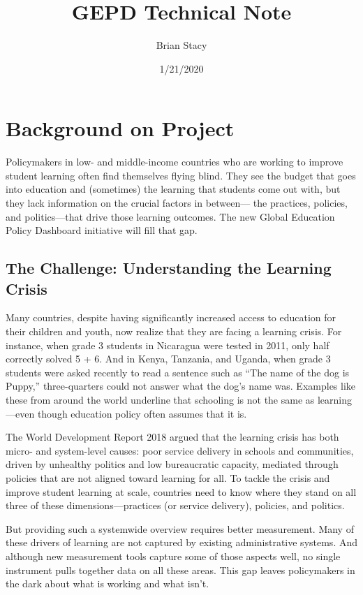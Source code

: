 \documentclass[]{article}
\title{GEPD Technical Note}
\author{Brian Stacy}
\date{1/21/2020}
\begin{document}
\maketitle

{
\setcounter{tocdepth}{2}
\tableofcontents
}
\hypertarget{background-on-project}{%
\section{Background on Project}\label{background-on-project}}

Policymakers in low- and middle-income countries who are working to
improve student learning often find themselves flying blind. They see
the budget that goes into education and (sometimes) the learning that
students come out with, but they lack information on the crucial factors
in between--- the practices, policies, and politics---that drive those
learning outcomes. The new Global Education Policy Dashboard initiative
will fill that gap.

\hypertarget{the-challenge-understanding-the-learning-crisis}{%
\subsection{The Challenge: Understanding the Learning
Crisis}\label{the-challenge-understanding-the-learning-crisis}}

Many countries, despite having significantly increased access to
education for their children and youth, now realize that they are facing
a learning crisis. For instance, when grade 3 students in Nicaragua were
tested in 2011, only half correctly solved 5 + 6. And in Kenya,
Tanzania, and Uganda, when grade 3 students were asked recently to read
a sentence such as ``The name of the dog is Puppy,'' three-quarters
could not answer what the dog's name was. Examples like these from
around the world underline that schooling is not the same as
learning---even though education policy often assumes that it is.

The World Development Report 2018 argued that the learning crisis has
both micro- and system-level causes: poor service delivery in schools
and communities, driven by unhealthy politics and low bureaucratic
capacity, mediated through policies that are not aligned toward learning
for all. To tackle the crisis and improve student learning at scale,
countries need to know where they stand on all three of these
dimensions---practices (or service delivery), policies, and politics.

But providing such a systemwide overview requires better measurement.
Many of these drivers of learning are not captured by existing
administrative systems. And although new measurement tools capture some
of those aspects well, no single instrument pulls together data on all
these areas. This gap leaves policymakers in the dark about what is
working and what isn't.
\end{document}
